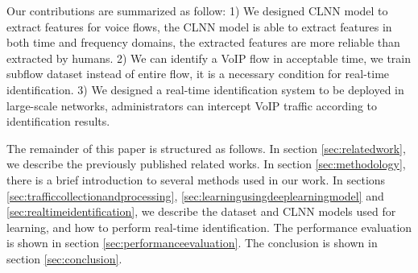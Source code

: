 \documentclass[conference]{IEEEtran}
\begin{document}
Our contributions are summarized as follow: 1) We designed CLNN model to extract features for voice flows, the CLNN model is able to extract features in both time and frequency domains, the extracted features are more reliable than extracted by humans. 2) We can identify a VoIP flow in acceptable time, we train subflow dataset instead of entire flow, it is a necessary condition for real-time identification. 3) We designed a real-time identification system to be deployed in large-scale networks, administrators can intercept VoIP traffic according to identification results.

The remainder of this paper is structured as follows. In section \ref{sec:relatedwork}, we describe the previously published related works.  In section \ref{sec:methodology}, there is a brief introduction to several methods used in our work.
In sections \ref{sec:trafficcollectionandprocessing}, \ref{sec:learningusingdeeplearningmodel} and \ref{sec:realtimeidentification}, we describe the dataset and CLNN models used for learning, and how to perform real-time identification. The performance evaluation is shown in section \ref{sec:performanceevaluation}. The conclusion is shown in section \ref{sec:conclusion}.





\end{document}
